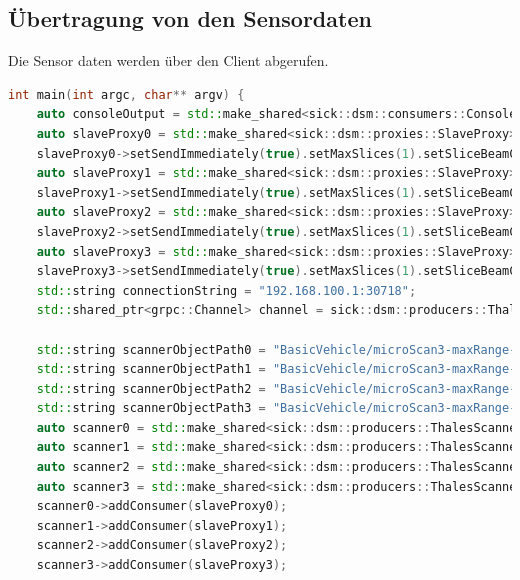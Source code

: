 
\subsection{Übertragung von den Sensordaten}
Die Sensor daten werden über den Client abgerufen.

\begin{lstlisting}[caption=Sample Code Listing C++, label={lst:listing-cpp}, language=C++]
int main(int argc, char** argv) {
    auto consoleOutput = std::make_shared<sick::dsm::consumers::ConsoleOutputConsumer>();
    auto slaveProxy0 = std::make_shared<sick::dsm::proxies::SlaveProxy>("127.0.0.1", 5555, 6555);
    slaveProxy0->setSendImmediately(true).setMaxSlices(1).setSliceBeamCount(2200).setMtuSize(1460).setIndex(0).setIdentifier({127, 0, 0, 1, 0x15, 0xb3, 0, 0}).initialise();
    auto slaveProxy1 = std::make_shared<sick::dsm::proxies::SlaveProxy>("127.0.0.1", 5556, 6556);
    slaveProxy1->setSendImmediately(true).setMaxSlices(1).setSliceBeamCount(2200).setMtuSize(1460).setIndex(0).setIdentifier({127, 0, 0, 1, 0x15, 0xb4, 0, 0}).initialise();
    auto slaveProxy2 = std::make_shared<sick::dsm::proxies::SlaveProxy>("127.0.0.1", 5557, 6557);
    slaveProxy2->setSendImmediately(true).setMaxSlices(1).setSliceBeamCount(2200).setMtuSize(1460).setIndex(0).setIdentifier({127, 0, 0, 1, 0x15, 0xb5, 0, 0}).initialise();
    auto slaveProxy3 = std::make_shared<sick::dsm::proxies::SlaveProxy>("127.0.0.1", 5558, 6558);
    slaveProxy3->setSendImmediately(true).setMaxSlices(1).setSliceBeamCount(2200).setMtuSize(1460).setIndex(0).setIdentifier({127, 0, 0, 1, 0x15, 0xb6, 0, 0}).initialise();
    std::string connectionString = "192.168.100.1:30718";
    std::shared_ptr<grpc::Channel> channel = sick::dsm::producers::ThalesGrpcClient::getInstance(connectionString).getChannel();

    std::string scannerObjectPath0 = "BasicVehicle/microScan3-maxRange-Rasterization-0";
    std::string scannerObjectPath1 = "BasicVehicle/microScan3-maxRange-Rasterization-1";
    std::string scannerObjectPath2 = "BasicVehicle/microScan3-maxRange-Rasterization-2";
    std::string scannerObjectPath3 = "BasicVehicle/microScan3-maxRange-Rasterization-3";
    auto scanner0 = std::make_shared<sick::dsm::producers::ThalesScanner>(scannerObjectPath0, channel);
    auto scanner1 = std::make_shared<sick::dsm::producers::ThalesScanner>(scannerObjectPath1, channel);
    auto scanner2 = std::make_shared<sick::dsm::producers::ThalesScanner>(scannerObjectPath2, channel);
    auto scanner3 = std::make_shared<sick::dsm::producers::ThalesScanner>(scannerObjectPath3, channel);
    scanner0->addConsumer(slaveProxy0);
    scanner1->addConsumer(slaveProxy1);
    scanner2->addConsumer(slaveProxy2);
    scanner3->addConsumer(slaveProxy3);


\end{lstlisting}
